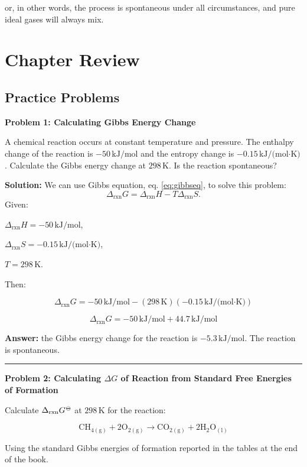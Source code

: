 \documentclass[
  9pt,
]{extbook}
\theoremstyle{definition}
\theoremstyle{definition}
\theoremstyle{definition}
\theoremstyle{definition}
\theoremstyle{remark}
\begin{document}
or, in other words, the process is spontaneous under all circumstances, and pure ideal gases will always mix.

\section{Chapter Review}\label{rev9}

\subsection{Practice Problems}\label{exer9}

\textbf{Problem 1: Calculating Gibbs Energy Change}

A chemical reaction occurs at constant temperature and pressure. The enthalpy change of the reaction is \(-50\,\text{kJ/mol}\) and the entropy change is \(-0.15\,\text{kJ/(mol·K)}\). Calculate the Gibbs energy change at \(298\,\text{K}\). Is the reaction spontaneous?

\textbf{Solution:} We can use Gibbs equation, eq. \eqref{eq:gibbseq}, to solve this problem:
\[\Delta_{\text{rxn}} G= \Delta_{\text{rxn}} H - T\Delta_{\text{rxn}} S.\]
Given:

\(\Delta_{\text{rxn}} H = -50\,\text{kJ/mol}\),

\(\Delta_{\text{rxn}} S = -0.15\,\text{kJ/(mol·K)}\),

\(T=298\,\text{K}\).

Then:

\[\Delta_{\text{rxn}} G = -50\,\text{kJ/mol} - (298\,\text{K})(-0.15\,\text{kJ/(mol·K)})\]

\[\Delta_{\text{rxn}} G = -50\,\text{kJ/mol} + 44.7\,\text{kJ/mol}\]

\textbf{Answer:} the Gibbs energy change for the reaction is \(-5.3\,\text{kJ/mol}\). The reaction is spontaneous.

\begin{center}\rule{0.5\linewidth}{0.5pt}\end{center}

\textbf{Problem 2: Calculating \(\Delta G\) of Reaction from Standard Free Energies of Formation}

Calculate \(\Delta_{\text{rxn}}G^{{-\kern-6pt{\ominus}\kern-6pt-}}\) at \(298\,\text{K}\) for the reaction:

\[\text{CH}_{4(\text{g})} + 2\text{O}_{2(\text{g})} \rightarrow \text{CO}_{2(\text{g})} + 2\text{H}_{2}\text{O}_{(\text{l})}\]

Using the standard Gibbs energies of formation reported in the tables at the end of the book.
\end{document}
